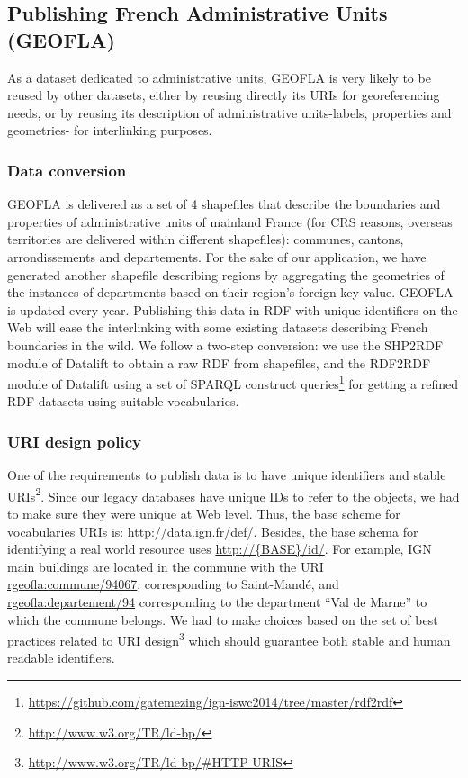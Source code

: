 \subsection{Publishing French Administrative Units (GEOFLA)} \label{sec:geofla}
As a dataset dedicated to administrative units, GEOFLA is very likely to be reused by other datasets, either by reusing directly its URIs for georeferencing needs, or by reusing its description of administrative units-labels, properties and geometries- for interlinking purposes.

\subsubsection{Data conversion}
\label{sec:dconversion}
GEOFLA  is delivered as a set of 4 shapefiles  that describe the boundaries and properties of administrative units of mainland France (for CRS reasons, overseas territories are delivered within different shapefiles): communes, cantons, arrondissements and departements. For the sake of our application, we have generated another shapefile describing regions by aggregating the geometries of the instances of departments based on their region's foreign key value. GEOFLA is updated every year.  Publishing this data in RDF with unique identifiers on the Web will ease the interlinking with some existing datasets describing French boundaries in the wild. We follow a two-step conversion: we use the SHP2RDF module of Datalift to obtain a raw RDF from shapefiles, and the RDF2RDF module of Datalift  using a set of SPARQL construct queries\footnote{ \url{https://github.com/gatemezing/ign-iswc2014/tree/master/rdf2rdf}} for getting a refined RDF datasets using suitable vocabularies.

\subsubsection{URI design policy} \label{sec:urigeofla}

One of the requirements to publish data is to have unique identifiers and stable URIs\footnote{\url{http://www.w3.org/TR/ld-bp/}}. Since our legacy databases have unique IDs to refer to the objects, we had to make sure they were unique at Web level. Thus, the base scheme for vocabularies URIs is: \url{http://data.ign.fr/def/}. Besides, the base schema for identifying a real world resource uses \url{http://{BASE}/id/}. For example, IGN main buildings  are located in the commune with the URI \url{rgeofla:commune/94067}, corresponding to Saint-Mand\'{e}, and \url{rgeofla:departement/94} corresponding to the department ``Val de Marne'' to which the commune belongs.
We had to make choices based on the set of best practices related to URI design\footnote{\url{http://www.w3.org/TR/ld-bp/\#HTTP-URIS}} which should guarantee both stable and human readable identifiers.


